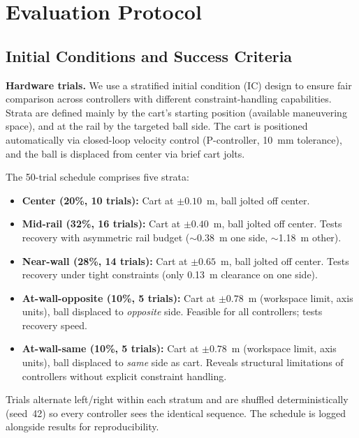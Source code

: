 \section{Evaluation Protocol}
\label{appendix:protocol}


\subsection{Initial Conditions and Success Criteria}
\label{sec:ic_design}

\textbf{Hardware trials.}
We use a stratified initial condition (IC) design to ensure
fair comparison across controllers with different constraint-handling
capabilities. Strata are defined mainly by the cart's starting
position (available maneuvering space), and at the rail by the targeted
ball side. The cart is positioned automatically via closed-loop
velocity control (P-controller, 10~mm tolerance), and the ball is
displaced from center via brief cart jolts.

The 50-trial schedule comprises five strata:
\begin{itemize}
    \item \textbf{Center (20\%, 10 trials):} Cart at $\pm 0.10$~m,
          ball jolted off center.
    \item \textbf{Mid-rail (32\%, 16 trials):} Cart at $\pm 0.40$~m,
          ball jolted off center. Tests recovery
          with asymmetric rail budget ($\sim$0.38~m one side,
          $\sim$1.18~m other).
    \item \textbf{Near-wall (28\%, 14 trials):} Cart at $\pm 0.65$~m,
          ball jolted off center. Tests recovery
          under tight constraints (only 0.13~m clearance on one side).
    \item \textbf{At-wall-opposite (10\%, 5 trials):} Cart at
          $\pm 0.78$~m (workspace limit, axis units), ball displaced to
          \emph{opposite} side. Feasible for all controllers;
          tests recovery speed.
    \item \textbf{At-wall-same (10\%, 5 trials):} Cart at
          $\pm 0.78$~m (workspace limit, axis units), ball displaced to
          \emph{same} side as cart. Reveals structural limitations
          of controllers without explicit constraint handling.
\end{itemize}

Trials alternate left/right within each stratum and are shuffled
deterministically (seed~42) so every controller sees the identical
sequence.  The schedule is logged alongside results for reproducibility.

